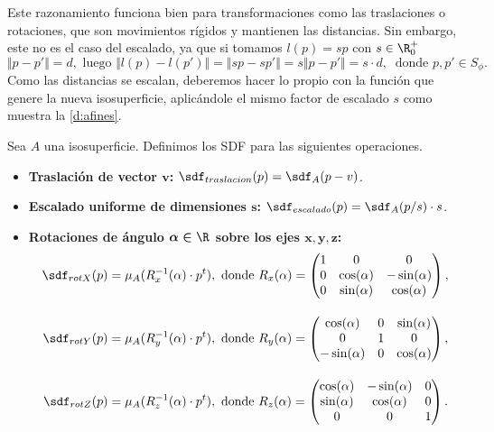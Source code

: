 Este razonamiento funciona bien para transformaciones como las traslaciones o rotaciones, que son movimientos rígidos y mantienen las distancias. Sin embargo, este no es el caso del escalado, ya que si tomamos $l(p) = sp$ con $s\in \R^+_0$
\begin{equation*}
    \Vert p-p'\Vert = d, \text{ luego }  \Vert l(p)-l(p')\Vert = \Vert sp-sp'\Vert = s\Vert p-p'\Vert = s\cdot d,\  \text{ donde } p,p' \in S_{\phi}.
\end{equation*}
Como las distancias se escalan, deberemos hacer lo propio con la función que genere la nueva isosuperficie, aplicándole el mismo factor de escalado $s$ como muestra la \autoref{d:afines}.

\begin{definicion}\label{d:afines}
    Sea $A$ una isosuperficie. Definimos los SDF para las siguientes operaciones.
    \begin{itemize}
        \item \textbf{Traslación de vector $\boldsymbol{v}$: } $\sdf_{traslacion}(p) = \sdf_{A}(p - v)$.
        \item \textbf{Escalado uniforme de dimensiones $\boldsymbol{s}$: } $\sdf_{escalado}(p) = \sdf_{A}(p/s)\cdot s$.
        \item \textbf{Rotaciones de ángulo $\boldsymbol{\alpha\in \R}$ sobre los ejes $\boldsymbol{x,y,z}$: }
        \begin{align*}
            \sdf_{rotX}(p) &= \mu_{A}(R_x^{-1}(\alpha)\cdot p^t),\ \text{donde } R_x(\alpha) = 
            \begin{pmatrix}
                1&0&0\\
                0&\cos(\alpha) & -\sin(\alpha) \\
                0&\sin(\alpha) & \cos(\alpha) 
                \end{pmatrix},\\[10pt] 
            \sdf_{rotY}(p) &= \mu_{A}(R_y^{-1}(\alpha)\cdot p^t),\ \text{donde } R_y(\alpha) = \begin{pmatrix}
            \cos(\alpha) &0& \sin(\alpha)\\
            0&1&0\\
            -\sin(\alpha) &0& \cos(\alpha) 
            \end{pmatrix},\\[10pt]
            \sdf_{rotZ}(p) &= \mu_{A}(R_z^{-1}(\alpha)\cdot p^t),\ \text{donde } R_z(\alpha) = \begin{pmatrix}
            \cos(\alpha) & -\sin(\alpha) & 0\\
            \sin(\alpha) & \cos(\alpha) & 0\\
            0&0&1
            \end{pmatrix}.
        \end{align*}
    \end{itemize}
\end{definicion}

